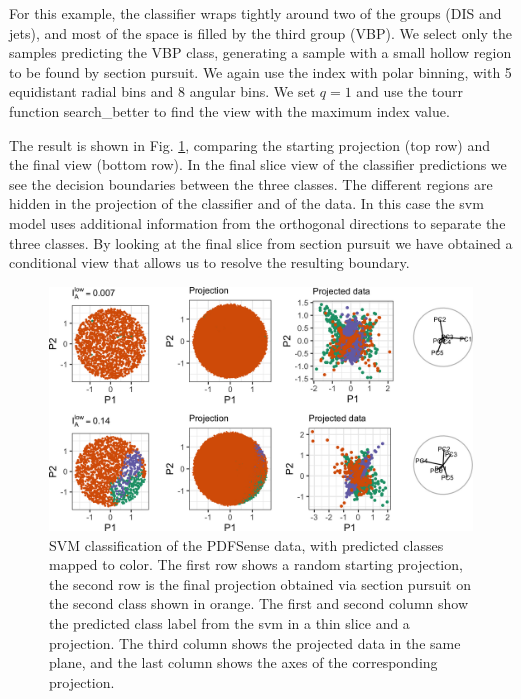 \documentclass[
]{article}
\begin{document}
For this example, the classifier wraps tightly around two of the groups
(DIS and jets), and most of the space is filled by the third group
(VBP). We select only the samples predicting the VBP class, generating a
sample with a small hollow region to be found by section pursuit. We
again use the index with polar binning, with 5 equidistant radial bins
and 8 angular bins. We set \(q=1\) and use the tourr function
search\_better to find the view with the maximum index value.

The result is shown in Fig. \ref{fig:pdffit}, comparing the starting
projection (top row) and the final view (bottom row). In the final slice
view of the classifier predictions we see the decision boundaries
between the three classes. The different regions are hidden in the
projection of the classifier and of the data. In this case the svm model
uses additional information from the orthogonal directions to separate
the three classes. By looking at the final slice from section pursuit we
have obtained a conditional view that allows us to resolve the resulting
boundary.

\begin{figure}
\includegraphics[width=1\linewidth]{appendix_files/figure-latex/pdffit-1} \caption{SVM classification of the PDFSense data, with predicted classes mapped to color. The first row shows a random starting projection, the second row is the final projection obtained via section pursuit on the second class shown in orange. The first and second column show the predicted class label from the svm in a thin slice and a projection. The third column shows the projected data in the same plane, and the last column shows the axes of the corresponding projection.}\label{fig:pdffit}
\end{figure}
\end{document}
